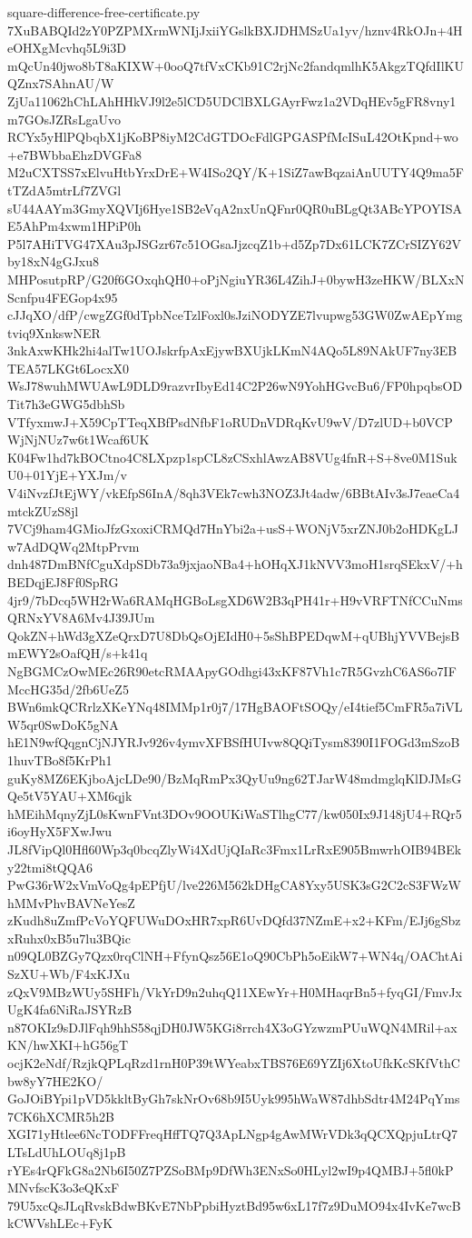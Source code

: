 \documentclass[11pt]{article}
\theoremstyle{definition}
\theoremstyle{remark}
\begin{document}
\begin{filecontents*}[overwrite]{square-difference-free-certificate.py}
7XuBABQId2zY0PZPMXrmWNIjJxiiYGslkBXJDHMSzUa1yv/hznv4RkOJn+4HeOHXgMcvhq5L9i3D
mQcUn40jwo8bT8aKIXW+0ooQ7tfVxCKb91C2rjNc2fandqmlhK5AkgzTQfdIlKUQZnx7SAhnAU/W
ZjUa11062hChLAhHHkVJ9l2e5lCD5UDClBXLGAyrFwz1a2VDqHEv5gFR8vny1m7GOsJZRsLgaUvo
RCYx5yHlPQbqbX1jKoBP8iyM2CdGTDOcFdlGPGASPfMcISuL42OtKpnd+wo+e7BWbbaEhzDVGFa8
M2uCXTSS7xElvuHtbYrxDrE+W4ISo2QY/K+1SiZ7awBqzaiAnUUTY4Q9ma5FtTZdA5mtrLf7ZVGl
sU44AAYm3GmyXQVIj6Hye1SB2eVqA2nxUnQFnr0QR0uBLgQt3ABcYPOYISAE5AhPm4xwm1HPiP0h
P5l7AHiTVG47XAu3pJSGzr67c51OGsaJjzcqZ1b+d5Zp7Dx61LCK7ZCrSIZY62Vby18xN4gGJxu8
MHPosutpRP/G20f6GOxqhQH0+oPjNgiuYR36L4ZihJ+0bywH3zeHKW/BLXxNScnfpu4FEGop4x95
cJJqXO/dfP/cwgZGf0dTpbNceTzlFoxl0sJziNODYZE7lvupwg53GW0ZwAEpYmgtviq9XnkswNER
3nkAxwKHk2hi4alTw1UOJskrfpAxEjywBXUjkLKmN4AQo5L89NAkUF7ny3EBTEA57LKGt6LocxX0
WsJ78wuhMWUAwL9DLD9razvrIbyEd14C2P26wN9YohHGvcBu6/FP0hpqbsODTit7h3eGWG5dbhSb
VTfyxmwJ+X59CpTTeqXBfPsdNfbF1oRUDnVDRqKvU9wV/D7zlUD+b0VCPWjNjNUz7w6t1Wcaf6UK
K04Fw1hd7kBOCtno4C8LXpzp1spCL8zCSxhlAwzAB8VUg4fnR+S+8ve0M1SukU0+01YjE+YXJm/v
V4iNvzfJtEjWY/vkEfpS6InA/8qh3VEk7cwh3NOZ3Jt4adw/6BBtAIv3sJ7eaeCa4mtckZUzS8jl
7VCj9ham4GMioJfzGxoxiCRMQd7HnYbi2a+usS+WONjV5xrZNJ0b2oHDKgLJw7AdDQWq2MtpPrvm
dnh487DmBNfCguXdpSDb73a9jxjaoNBa4+hOHqXJ1kNVV3moH1srqSEkxV/+hBEDqjEJ8Ff0SpRG
4jr9/7bDcq5WH2rWa6RAMqHGBoLsgXD6W2B3qPH41r+H9vVRFTNfCCuNmsQRNxYV8A6Mv4J39JUm
QokZN+hWd3gXZeQrxD7U8DbQsOjEIdH0+5sShBPEDqwM+qUBhjYVVBejsBmEWY2sOafQH/s+k41q
NgBGMCzOwMEc26R90etcRMAApyGOdhgi43xKF87Vh1c7R5GvzhC6AS6o7IFMccHG35d/2fb6UeZ5
BWn6mkQCRrlzXKeYNq48IMMp1r0j7/17HgBAOFtSOQy/eI4tief5CmFR5a7iVLW5qr0SwDoK5gNA
hE1N9wfQqgnCjNJYRJv926v4ymvXFBSfHUIvw8QQiTysm8390I1FOGd3mSzoB1huvTBo8f5KrPh1
guKy8MZ6EKjboAjcLDe90/BzMqRmPx3QyUu9ng62TJarW48mdmglqKlDJMsGQe5tV5YAU+XM6qjk
hMEihMqnyZjL0sKwnFVnt3DOv9OOUKiWaSTlhgC77/kw050Ix9J148jU4+RQr5i6oyHyX5FXwJwu
JL8fVipQl0Hfl60Wp3q0bcqZlyWi4XdUjQIaRc3Fmx1LrRxE905BmwrhOIB94BEky22tmi8tQQA6
PwG36rW2xVmVoQg4pEPfjU/lve226M562kDHgCA8Yxy5USK3sG2C2cS3FWzWhMMvPhvBAVNeYesZ
zKudh8uZmfPcVoYQFUWuDOxHR7xpR6UvDQfd37NZmE+x2+KFm/EJj6gSbzxRuhx0xB5u7lu3BQic
n09QL0BZGy7Qzx0rqClNH+FfynQsz56E1oQ90CbPh5oEikW7+WN4q/OAChtAiSzXU+Wb/F4xKJXu
zQxV9MBzWUy5SHFh/VkYrD9n2uhqQ11XEwYr+H0MHaqrBn5+fyqGI/FmvJxUgK4fa6NiRaJSYRzB
n87OKIz9sDJlFqh9hhS58qjDH0JW5KGi8rrch4X3oGYzwzmPUuWQN4MRil+axKN/hwXKI+hG56gT
ocjK2eNdf/RzjkQPLqRzd1rnH0P39tWYeabxTBS76E69YZIj6XtoUfkKcSKfVthCbw8yY7HE2KO/
GoJOiBYpi1pVD5kkltByGh7skNrOv68b9I5Uyk995hWaW87dhbSdtr4M24PqYms7CK6hXCMR5h2B
XGI71yHtlee6NcTODFFreqHffTQ7Q3ApLNgp4gAwMWrVDk3qQCXQpjuLtrQ7LTsLdUhLOUq8j1pB
rYEs4rQFkG8a2Nb6I50Z7PZSoBMp9DfWh3ENxSo0HLyl2wI9p4QMBJ+5fl0kPMNvfscK3o3eQKxF
79U5xcQsJLqRvskBdwBKvE7NbPpbiHyztBd95w6xL17f7z9DuMO94x4IvKe7wcBkCWVshLEc+FyK

\end{filecontents*}
\end{document}
